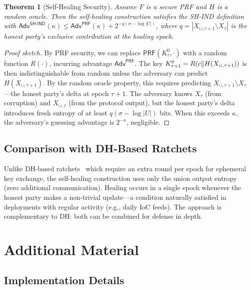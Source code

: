 \documentclass[letterpaper,twocolumn,10pt]{article}
\newtheorem{theorem}{Theorem}
\theoremstyle{definition}
\newcommand{\PRF}{\mathsf{PRF}}\newcommand{\ChaCha}{\mathsf{ChaCha20}}
\begin{document}
\begin{theorem}[Self-Healing Security]\label{thm:selfheal}
Assume $F$ is a secure PRF and $H$ is a random oracle. Then the
self-healing construction satisfies the SH-IND definition with
$\mathsf{Adv}^{\mathsf{SH\text{-}IND}}(\kappa) \leq
\mathsf{Adv}^{\mathsf{PRF}}(\kappa) + 2^{-q(\sigma - \log|U|)}$, where
$q = |X_{\cup,\tau+1} \setminus X_\tau|$ is the honest party's exclusive
contribution at the healing epoch.
\end{theorem}

\begin{proof}[Proof sketch]
By PRF security, we can replace $\PRF(K^0_\tau, \cdot)$ with a random
function $R(\cdot)$, incurring advantage $\mathsf{Adv}^{\mathsf{PRF}}$.
The key $K^0_{\tau+1} = R(c \| H(X_{\cup,\tau+1}))$ is then
indistinguishable from random unless the adversary can predict
$H(X_{\cup,\tau+1})$. By the random oracle property, this requires
predicting $X_{\cup,\tau+1} \setminus X_\tau$---the honest party's delta
at epoch $\tau+1$. The adversary knows $X_\tau$ (from corruption) and
$X_{\cup,\tau}$ (from the protocol output), but the honest party's delta
introduces fresh entropy of at least $q(\sigma - \log|U|)$ bits.
When this exceeds $\kappa$, the adversary's guessing advantage is
$2^{-\kappa}$, negligible.
\end{proof}

\subsection{Comparison with DH-Based Ratchets}

Unlike DH-based ratchets~\cite{Signal} which require an extra round per
epoch for ephemeral key exchange, the self-healing construction uses only
the union output entropy (zero additional communication). Healing occurs
in a single epoch whenever the honest party makes a non-trivial
update---a condition naturally satisfied in deployments with regular
activity (e.g., daily IoC feeds). The approach is complementary to DH:
both can be combined for defense in depth.

\section{Additional Material}
\label{sec:additional}

\subsection{Implementation Details}
\label{sec:impl-details}
\end{document}
